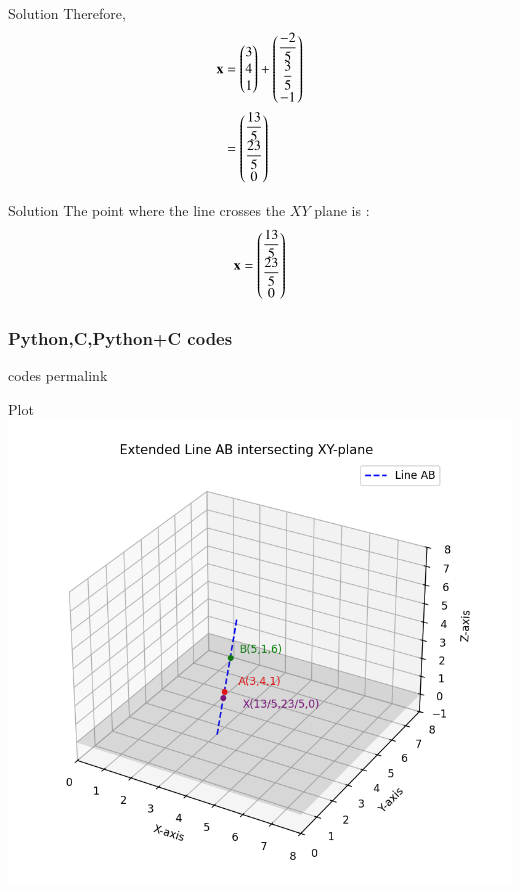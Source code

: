 \documentclass{beamer}
\begin{document}
\begin{frame}{Solution}
    Therefore,
\begin{align}
    \mathbf{x} &= \begin{pmatrix}3\\4\\1\end{pmatrix} + \begin{pmatrix}\dfrac{-2}{5} \\ \dfrac{3}{5} \\ -1\end{pmatrix} \\
    &= \begin{pmatrix}\dfrac{13}{5} \\ \dfrac{23}{5} \\ 0\end{pmatrix}
\end{align}
\end{frame}

\begin{frame}{Solution}
    The point where the line crosses the $XY$ plane is :
\begin{align}
    \mathbf{x} = \begin{pmatrix}\dfrac{13}{5} \\ \dfrac{23}{5} \\ 0\end{pmatrix}
\end{align}
\end{frame}

\begin{frame}[fragile]
\frametitle{Python,C,Python+C codes}
codes permalink
\end{frame}

\begin{frame}{Plot}
    \centering
    \includegraphics[width=\columnwidth, height=0.8\textheight, keepaspectratio]{figs/fig.png}
\end{frame}
\end{document}
